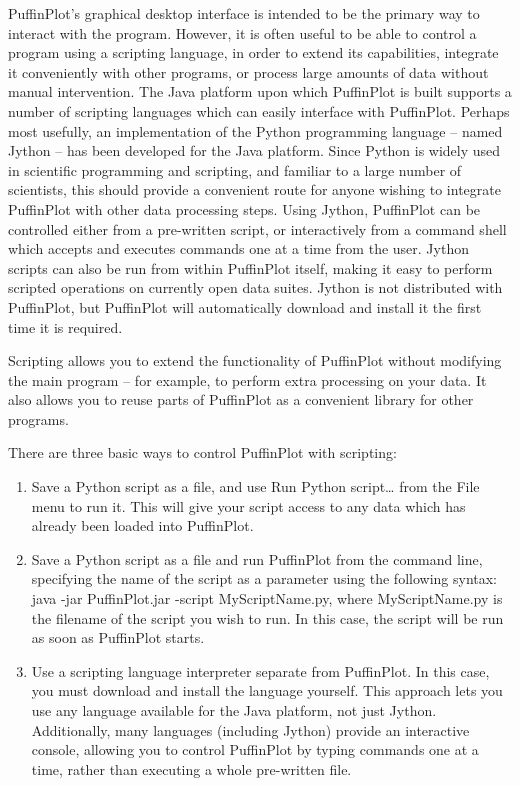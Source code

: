 \documentclass[a4paper,british]{article}
\newcommand{\ppcmd}[1]{\textsf{#1}} %
\begin{document}
PuffinPlot's graphical desktop interface is intended to be the primary way to
interact with the program. However, it is often useful to be able to control
a program using a scripting language, in order to extend its capabilities,
integrate it conveniently with other programs, or process large amounts of
data without manual intervention. The Java platform upon which PuffinPlot is
built supports a number of scripting languages which can easily interface
with PuffinPlot. Perhaps most usefully, an implementation of the Python
programming language -- named Jython \citep{juneau2009jython} -- has been
developed for the Java platform. Since Python is widely used in scientific
programming and scripting, and familiar to a large number of scientists, this
should provide a convenient route for anyone wishing to integrate PuffinPlot
with other data processing steps. Using Jython, PuffinPlot can be controlled
either from a pre-written script, or interactively from a command shell which
accepts and executes commands one at a time from the user. Jython scripts
can also be run from within PuffinPlot itself, making it easy to perform
scripted operations on currently open data suites. Jython is not distributed
with PuffinPlot, but PuffinPlot will automatically download and install it the
first time it is required.

Scripting allows you to extend the functionality of PuffinPlot without
modifying the main program -- for example, to perform extra processing on
your data. It also allows you to reuse parts of PuffinPlot as a convenient
library for other programs.

There are three basic ways to control PuffinPlot with scripting:

\begin{enumerate}

\item Save a Python script as a file, and use \ppcmd{Run Python script\ldots}
  from the \ppcmd{File} menu to run it. This will give your script access to
  any data which has already been loaded into PuffinPlot.

\item Save a Python script as a file and run PuffinPlot from the command
  line, specifying the name of the script as a parameter using the following
  syntax: \ppcmd{java -jar PuffinPlot.jar -script MyScriptName.py}, where
  \ppcmd{MyScriptName.py} is the filename of the script you wish to run.
  In this case, the script will be run as soon as PuffinPlot starts.

\item Use a scripting language interpreter separate from PuffinPlot. In this
  case, you must download and install the language yourself. This approach
  lets you use any language available for the Java platform, not just Jython.
  Additionally, many languages (including Jython) provide an interactive
  console, allowing you to control PuffinPlot by typing commands one at a
  time, rather than executing a whole pre-written file.

\end{enumerate}
\end{document}
